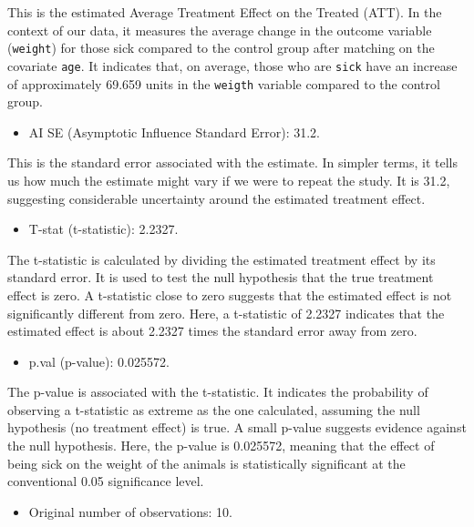 \documentclass[
]{article}
\providecommand{\tightlist}{%
  \setlength{\itemsep}{0pt}\setlength{\parskip}{0pt}}
\begin{document}
This is the estimated Average Treatment Effect on the Treated (ATT). In
the context of our data, it measures the average change in the outcome
variable (\texttt{weight}) for those sick compared to the control group
after matching on the covariate \texttt{age}. It indicates that, on
average, those who are \texttt{sick} have an increase of approximately
69.659 units in the \texttt{weigth} variable compared to the control
group.

\begin{itemize}
\tightlist
\item
  AI SE (Asymptotic Influence Standard Error): 31.2.
\end{itemize}

This is the standard error associated with the estimate. In simpler
terms, it tells us how much the estimate might vary if we were to repeat
the study. It is 31.2, suggesting considerable uncertainty around the
estimated treatment effect.

\begin{itemize}
\tightlist
\item
  T-stat (t-statistic): 2.2327.
\end{itemize}

The t-statistic is calculated by dividing the estimated treatment effect
by its standard error. It is used to test the null hypothesis that the
true treatment effect is zero. A t-statistic close to zero suggests that
the estimated effect is not significantly different from zero. Here, a
t-statistic of 2.2327 indicates that the estimated effect is about
2.2327 times the standard error away from zero.

\begin{itemize}
\tightlist
\item
  p.val (p-value): 0.025572.
\end{itemize}

The p-value is associated with the t-statistic. It indicates the
probability of observing a t-statistic as extreme as the one calculated,
assuming the null hypothesis (no treatment effect) is true. A small
p-value suggests evidence against the null hypothesis. Here, the p-value
is 0.025572, meaning that the effect of being sick on the weight of the
animals is statistically significant at the conventional 0.05
significance level.

\begin{itemize}
\tightlist
\item
  Original number of observations: 10.
\end{itemize}
\end{document}
